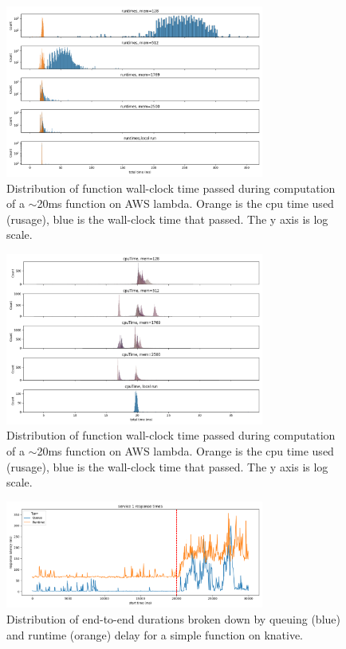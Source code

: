 \begin{figure}[t!]
  \centering
    \includegraphics[width=8.5cm]{img/aws_cpubench_times.png}
    \caption{ Distribution of function wall-clock time passed during computation
    of a $\sim$20ms function on AWS lambda. Orange is the cpu time used
    (rusage), blue is the wall-clock time that passed. The y axis is log scale.
    }
  \label{fig:lambda-cpu-bench}
\end{figure}

\begin{figure}[t!]
  \centering
    \includegraphics[width=8.5cm]{img/aws_cpubench_cputimes.png}
    \caption{ Distribution of function wall-clock time passed during computation
    of a $\sim$20ms function on AWS lambda. Orange is the cpu time used
    (rusage), blue is the wall-clock time that passed. The y axis is log scale.
    }
  \label{fig:lambda-cputimes}
\end{figure}

\begin{figure}[t!]
    \centering
      \includegraphics[width=8.5cm]{img/knative_loadexp_times.png}
      \caption{Distribution of end-to-end durations broken down by
        queuing (blue) and runtime (orange) delay for a simple function on
        knative.}
    \label{fig:knative}
\end{figure}

